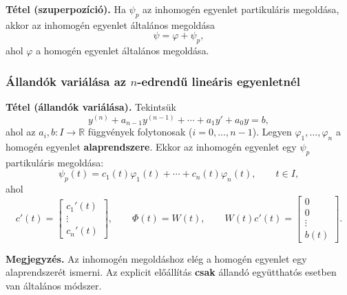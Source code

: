 \begin{matbox}
\textbf{Tétel (szuperpozíció).}
Ha $\psi_p$ az inhomogén egyenlet partikuláris megoldása,
akkor az inhomogén egyenlet általános megoldása
\[
 \psi=\varphi+\psi_p,
\]
ahol $\varphi$ a homogén egyenlet általános megoldása.
\end{matbox}

\subsubsection*{Állandók variálása az $n$-edrendű lineáris egyenletnél}
\begin{matbox}
\textbf{Tétel (állandók variálása).} Tekintsük
\[
 y^{(n)}+a_{n-1}y^{(n-1)}+\cdots+a_1y'+a_0y=b,
\]
ahol az $a_i,b:I\to\mathbb R$ függvények folytonosak
($i=0,\ldots,n-1$).
Legyen $\varphi_1,\ldots,\varphi_n$ a homogén egyenlet
\textbf{alaprendszere}. Ekkor az inhomogén egyenlet egy
$\psi_p$ partikuláris megoldása:
\[
 \psi_p(t)=c_1(t)\varphi_1(t)+\cdots+c_n(t)\varphi_n(t),
 \qquad t\in I,
\]
ahol
\[
 c'(t)=\begin{bmatrix}
 c_1'(t)\\\vdots\\c_n'(t)
 \end{bmatrix},
 \qquad\Phi(t)=W(t),\qquad
 W(t)c'(t)=\begin{bmatrix}
 0\\0\\\vdots\\b(t)
 \end{bmatrix}.
\]
\end{matbox}

\textbf{Megjegyzés.} Az inhomogén megoldáshoz elég a homogén
egyenlet egy alaprendszerét ismerni. Az explicit előállítás
\textbf{csak} állandó együtthatós esetben van általános módszer.
